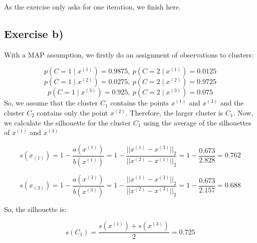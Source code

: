 \documentclass{article}
\begin{document}
As the exercise only asks for one iteration, we finish here.

\newpage
\subsection{Exercise b)}

With a MAP assumption, we firstly do an assignment of observations to clusters:

\[
p(C = 1 \mid x^{(1)}) = 0.9875, \: p(C = 2 \mid x^{(1)}) = 0.0125
\]
\[
p(C = 1 \mid x^{(2)}) = 0.0275, \: p(C = 2 \mid x^{(2)}) = 0.9725
\]
\[
p(C = 1 \mid x^{(3)}) = 0.925, \: p(C = 2 \mid x^{(3)}) = 0.075
\]
\newline
So, we assume that the cluster \(C_1\) contains the points \(x^{(1)}\) and \(x^{(3)}\) and the cluster
\(C_2\) contains only the point \(x^{(2)}\). Therefore, the larger cluster is \(C_1\).
\newline
Now, we calculate the silhouette for the cluster \(C_1\) using the average of the silhouettes of \(x^{(1)}\) and \(x^{(3)}\)

\[
s(x_{(1)}) = 1 - \frac{a(x^{(1)})}{b(x^{(1)})} = 1 - \frac{{||x^{(1)} - x^{(3)}||}_2}{{||x^{(2)} - x^{(1)}||}_2} = 1 - \frac{0.673}{2.828} = 0.762
\]

\[
s(x_{(3)}) = 1 - \frac{a(x^{(3)})}{b(x^{(3)})} = 1 - \frac{{||x^{(1)} - x^{(3)}||}_2}{{||x^{(2)} - x^{(3)}||}_2} = 1 - \frac{0.673}{2.157} = 0.688
\]

So, the silhouette is:

\[
s(C_1) = \frac{s(x^{(1)}) + s(x^{(3)})}{2} = 0.725
\]
\end{document}
